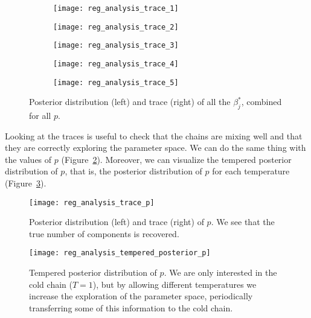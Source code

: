   \begin{figure}[ht!]
  \centering
  \begin{subfigure}[b]{.75\textwidth}
    \centering
    \texttt{[image: reg\_analysis\_trace\_1]}
  \end{subfigure}
  \begin{subfigure}[b]{.75\textwidth}
    \centering
    \texttt{[image: reg\_analysis\_trace\_2]}
  \end{subfigure}
  \begin{subfigure}[b]{.75\textwidth}
      \centering
      \texttt{[image: reg\_analysis\_trace\_3]}
  \end{subfigure}
  \begin{subfigure}[b]{.75\textwidth}
      \centering
      \texttt{[image: reg\_analysis\_trace\_4]}
  \end{subfigure}
  \begin{subfigure}[b]{.75\textwidth}
      \centering
      \texttt{[image: reg\_analysis\_trace\_5]}
  \end{subfigure}
  \caption{Posterior distribution (left) and trace (right) of all the \(\beta_j^*\), combined for all \(p\).}\label{fig:trace-plot}
\end{figure}

\FloatBarrier{}

Looking at the traces is useful to check that the chains are mixing well and that they are correctly exploring the parameter space. We can do the same thing with the values of \(p\) (Figure~\ref{fig:trace-p}). Moreover, we can visualize the tempered posterior distribution of \(p\), that is, the posterior distribution of \(p\) for each temperature (Figure~\ref{fig:tempered-posterior-p}).

\begin{figure}[ht!]
  \centering
  \texttt{[image: reg\_analysis\_trace\_p]}
  \caption{Posterior distribution (left) and trace (right) of \(p\). We see that the true number of components is recovered.}\label{fig:trace-p}
\end{figure}

\begin{figure}[ht!]
  \centering
  \texttt{[image: reg\_analysis\_tempered\_posterior\_p]}
  \caption{Tempered posterior distribution of \(p\). We are only interested in the cold chain (\(T=1\)), but by allowing different temperatures we increase the exploration of the parameter space, periodically transferring some of this information to the cold chain.}\label{fig:tempered-posterior-p}
\end{figure}

